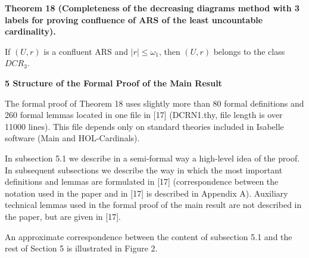 \documentclass[10pt,a4paper]{amsart}
\begin{document}
 
 

 
\par\medskip\noindent\textbf{Theorem 18 (Completeness of the decreasing diagrams method with 3 labels for proving confluence of ARS of the least uncountable cardinality).}\par
 
 
If $(U,r)$ is a confluent ARS and $|r|\leq\omega_{1}$, then $(U,r)$ belongs to the class $DCR_{3}$.\par
 
 

 
\par\medskip\noindent\textbf{5 Structure of the Formal Proof of the Main Result}\par
 
 
The formal proof of Theorem 18 uses slightly more than 80 formal definitions and 260 formal lemmas located in one file in [17] (DCRN1.thy, file length is over 11000 lines). This file depends only on standard theories included in Isabelle software (Main and HOL-Cardinals).\par
 
 
 
In subsection 5.1 we describe in a semi-formal way a high-level idea of the proof. In subsequent subsections we describe the way in which the most important definitions and lemmas are formulated in [17] (correspondence between the notation used in the paper and in [17] is described in Appendix A). Auxiliary technical lemmas used in the formal proof of the main result are not described in the paper, but are given in [17].\par
 
 
 
An approximate correspondence between the content of subsection 5.1 and the rest of Section 5 is illustrated in Figure 2.\par
 
 
 
\end{document}
